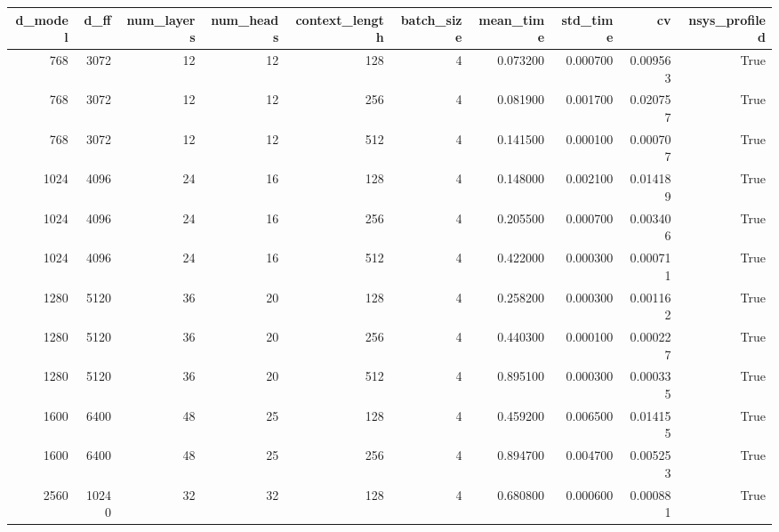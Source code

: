 \begin{tabular}{rrrrrrrrrr}
\toprule
d_model & d_ff & num_layers & num_heads & context_length & batch_size & mean_time & std_time & cv & nsys_profiled \\
\midrule
768 & 3072 & 12 & 12 & 128 & 4 & 0.073200 & 0.000700 & 0.009563 & True \\
768 & 3072 & 12 & 12 & 256 & 4 & 0.081900 & 0.001700 & 0.020757 & True \\
768 & 3072 & 12 & 12 & 512 & 4 & 0.141500 & 0.000100 & 0.000707 & True \\
1024 & 4096 & 24 & 16 & 128 & 4 & 0.148000 & 0.002100 & 0.014189 & True \\
1024 & 4096 & 24 & 16 & 256 & 4 & 0.205500 & 0.000700 & 0.003406 & True \\
1024 & 4096 & 24 & 16 & 512 & 4 & 0.422000 & 0.000300 & 0.000711 & True \\
1280 & 5120 & 36 & 20 & 128 & 4 & 0.258200 & 0.000300 & 0.001162 & True \\
1280 & 5120 & 36 & 20 & 256 & 4 & 0.440300 & 0.000100 & 0.000227 & True \\
1280 & 5120 & 36 & 20 & 512 & 4 & 0.895100 & 0.000300 & 0.000335 & True \\
1600 & 6400 & 48 & 25 & 128 & 4 & 0.459200 & 0.006500 & 0.014155 & True \\
1600 & 6400 & 48 & 25 & 256 & 4 & 0.894700 & 0.004700 & 0.005253 & True \\
2560 & 10240 & 32 & 32 & 128 & 4 & 0.680800 & 0.000600 & 0.000881 & True \\
\bottomrule
\end{tabular}
